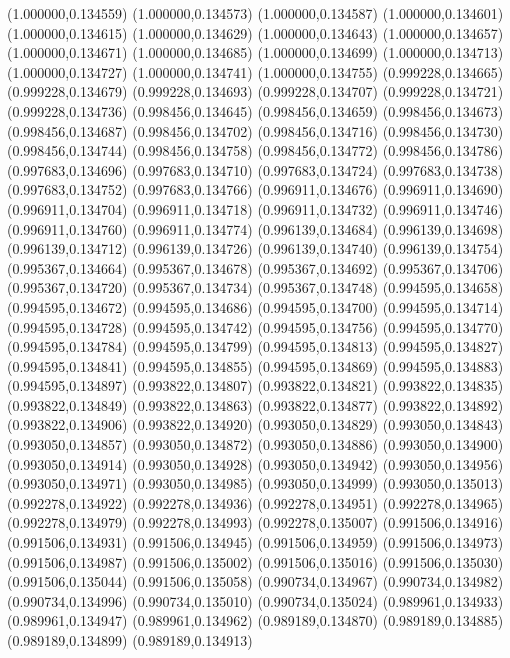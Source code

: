 (1.000000,0.134559)
(1.000000,0.134573)
(1.000000,0.134587)
(1.000000,0.134601)
(1.000000,0.134615)
(1.000000,0.134629)
(1.000000,0.134643)
(1.000000,0.134657)
(1.000000,0.134671)
(1.000000,0.134685)
(1.000000,0.134699)
(1.000000,0.134713)
(1.000000,0.134727)
(1.000000,0.134741)
(1.000000,0.134755)
(0.999228,0.134665)
(0.999228,0.134679)
(0.999228,0.134693)
(0.999228,0.134707)
(0.999228,0.134721)
(0.999228,0.134736)
(0.998456,0.134645)
(0.998456,0.134659)
(0.998456,0.134673)
(0.998456,0.134687)
(0.998456,0.134702)
(0.998456,0.134716)
(0.998456,0.134730)
(0.998456,0.134744)
(0.998456,0.134758)
(0.998456,0.134772)
(0.998456,0.134786)
(0.997683,0.134696)
(0.997683,0.134710)
(0.997683,0.134724)
(0.997683,0.134738)
(0.997683,0.134752)
(0.997683,0.134766)
(0.996911,0.134676)
(0.996911,0.134690)
(0.996911,0.134704)
(0.996911,0.134718)
(0.996911,0.134732)
(0.996911,0.134746)
(0.996911,0.134760)
(0.996911,0.134774)
(0.996139,0.134684)
(0.996139,0.134698)
(0.996139,0.134712)
(0.996139,0.134726)
(0.996139,0.134740)
(0.996139,0.134754)
(0.995367,0.134664)
(0.995367,0.134678)
(0.995367,0.134692)
(0.995367,0.134706)
(0.995367,0.134720)
(0.995367,0.134734)
(0.995367,0.134748)
(0.994595,0.134658)
(0.994595,0.134672)
(0.994595,0.134686)
(0.994595,0.134700)
(0.994595,0.134714)
(0.994595,0.134728)
(0.994595,0.134742)
(0.994595,0.134756)
(0.994595,0.134770)
(0.994595,0.134784)
(0.994595,0.134799)
(0.994595,0.134813)
(0.994595,0.134827)
(0.994595,0.134841)
(0.994595,0.134855)
(0.994595,0.134869)
(0.994595,0.134883)
(0.994595,0.134897)
(0.993822,0.134807)
(0.993822,0.134821)
(0.993822,0.134835)
(0.993822,0.134849)
(0.993822,0.134863)
(0.993822,0.134877)
(0.993822,0.134892)
(0.993822,0.134906)
(0.993822,0.134920)
(0.993050,0.134829)
(0.993050,0.134843)
(0.993050,0.134857)
(0.993050,0.134872)
(0.993050,0.134886)
(0.993050,0.134900)
(0.993050,0.134914)
(0.993050,0.134928)
(0.993050,0.134942)
(0.993050,0.134956)
(0.993050,0.134971)
(0.993050,0.134985)
(0.993050,0.134999)
(0.993050,0.135013)
(0.992278,0.134922)
(0.992278,0.134936)
(0.992278,0.134951)
(0.992278,0.134965)
(0.992278,0.134979)
(0.992278,0.134993)
(0.992278,0.135007)
(0.991506,0.134916)
(0.991506,0.134931)
(0.991506,0.134945)
(0.991506,0.134959)
(0.991506,0.134973)
(0.991506,0.134987)
(0.991506,0.135002)
(0.991506,0.135016)
(0.991506,0.135030)
(0.991506,0.135044)
(0.991506,0.135058)
(0.990734,0.134967)
(0.990734,0.134982)
(0.990734,0.134996)
(0.990734,0.135010)
(0.990734,0.135024)
(0.989961,0.134933)
(0.989961,0.134947)
(0.989961,0.134962)
(0.989189,0.134870)
(0.989189,0.134885)
(0.989189,0.134899)
(0.989189,0.134913)
